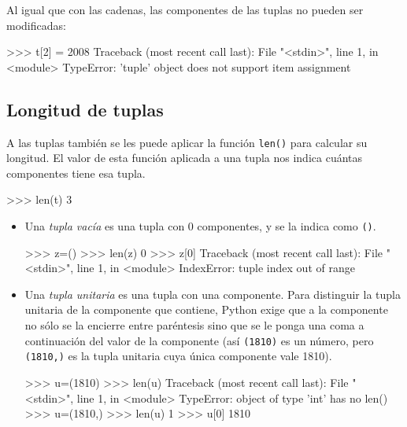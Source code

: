 Al igual que con las cadenas, las componentes de las tuplas no pueden ser
modificadas:

\begin{codigo-python-sn}
>>> t[2] = 2008
Traceback (most recent call last):
  File "<stdin>", line 1, in <module>
TypeError: 'tuple' object does not support item assignment
\end{codigo-python-sn}

\subsection{Longitud de tuplas}

A las tuplas también se les puede aplicar la función \lstinline+len()+
para calcular su longitud. El valor de esta función aplicada a
una tupla nos indica cuántas componentes tiene esa tupla.

\begin{codigo-python-sn}
>>> len(t)
3
\end{codigo-python-sn}


\begin{itemize}
\item Una {\it tupla vacía} es una tupla con $0$ componentes, y se la
indica como \lstinline+()+.

\begin{codigo-python-sn}
>>> z=()
>>> len(z)
0
>>> z[0]
Traceback (most recent call last):
  File "<stdin>", line 1, in <module>
IndexError: tuple index out of range
\end{codigo-python-sn}

\item Una {\it tupla unitaria} es una tupla con una componente. Para
distinguir la tupla unitaria de la componente que contiene, Python exige
que a la componente no sólo se la encierre entre paréntesis sino que se le
ponga una coma a continuación del valor de la componente (así
\lstinline+(1810)+ es un número, pero \lstinline+(1810,)+ es la tupla
unitaria cuya única componente vale 1810).

\begin{codigo-python-sn}
>>> u=(1810)
>>> len(u)
Traceback (most recent call last):
  File "<stdin>", line 1, in <module>
TypeError: object of type 'int' has no len()
>>> u=(1810,)
>>> len(u)
1
>>> u[0]
1810
\end{codigo-python-sn}
\end{itemize}

